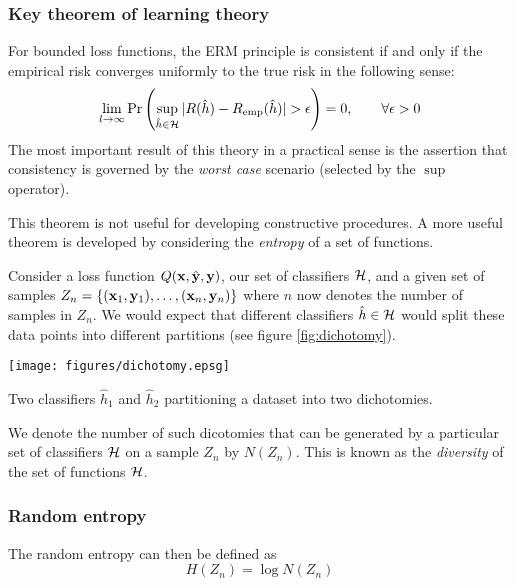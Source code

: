 \subsubsection{Key theorem of learning theory}

For bounded loss functions, the ERM principle is consistent if and
only if the empirical risk converges uniformly to the true risk in the
following sense:
%
\begin{equation}
\lim_{l \rightarrow \infty} \Pr \left( \sup_{\hat{h} \in \mathcal{H}} 
| R(\hat{h}) - R_{\mathrm{emp}}(\hat{h}) | > \epsilon \right) = 0,
\qquad \forall \epsilon > 0
\end{equation}
%
The most important result of this theory in a practical sense is the
assertion that consistency is governed by the \emph{worst case}
scenario (selected by the $\sup$ operator).

This theorem is not useful for developing constructive procedures.  A
more useful theorem is developed by considering the \emph{entropy} of
a set of functions.

Consider a loss function $Q(\mathbf{x}, \hat{\mathbf{y}}, \mathbf{y})$, our set of
classifiers $\mathcal{H}$, and a given set of samples $Z_n = \{ (\mathbf{x}_1,
\mathbf{y}_1), \ldots, (\mathbf{x}_n, \mathbf{y}_n) \}$ where $n$ now denotes the number
of samples in $Z_n$.  We would expect that different classifiers
$\hat{h} \in \mathcal{H}$ would split these data points into different
partitions (see figure \ref{fig:dichotomy}).

\begin{linefigure}
\begin{center}
\texttt{[image: figures/dichotomy.epsg]}
\end{center}
\caption{Two classifiers $\hat{h}_1$ and $\hat{h}_2$ partitioning a
dataset into two dichotomies.}
\label{fig:dichotomy}
\end{linefigure}

We denote the number of such dicotomies that can be generated by a
particular set of classifiers $\mathcal{H}$ on a sample $Z_n$ by $N(Z_n)$.
This is known as the \emph{diversity} of the set of functions $\mathcal{H}$.

\subsubsection{Random entropy}

The random entropy can then be defined as
%
\begin{equation}
H(Z_n) = \log N(Z_n)
\end{equation}

